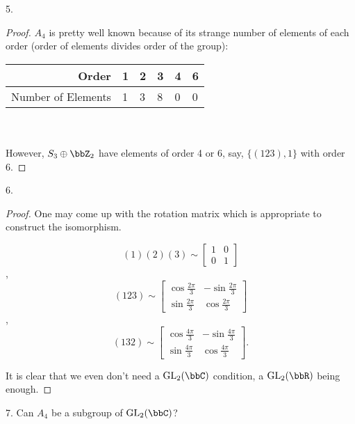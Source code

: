 \begin{exercise}
    5.
\end{exercise}

\begin{proof}
    $A_4$ is pretty well known because of its strange number of elements of each order (order of elements divides order of the group): \\


    \begin{tabular}{rlllll}
    \toprule
    Order              & 1 & 2 & 3 & 4 & 6 \\ \midrule
    Number of Elements & 1 & 3 & 8 & 0 & 0 \\ \bottomrule
    \end{tabular}\\\\
    
    However, $S_3 \oplus \bbZ_2$ have elements of order 4 or 6, say, $\{(123), 1\}$ with order 6. 
\end{proof}

\begin{exercise}
    6.
\end{exercise}

\begin{proof}
    One may come up with the rotation matrix which is appropriate to construct the isomorphism.
    
    $$(1)(2)(3)\sim \begin{bmatrix}
        1 & 0\\
        0 & 1
    \end{bmatrix}$$,
    $$(123)\sim \begin{bmatrix}
        \cos \frac{2\pi}{3} & -\sin \frac{2\pi}{3}\\
        \sin \frac{2\pi}{3} & \cos \frac{2\pi}{3}
    \end{bmatrix}$$,
    $$(132)\sim \begin{bmatrix}
        \cos \frac{4\pi}{3} & -\sin \frac{4\pi}{3}\\
        \sin \frac{4\pi}{3} & \cos \frac{4\pi}{3}
    \end{bmatrix}.$$

    It is clear that we even don't need a $\mathrm{GL}_2(\bbC)$ condition, a $\mathrm{GL}_2(\bbR)$ being enough.
\end{proof}

\begin{exercise}
    7. Can $A_4$ be a subgroup of $\mathrm{GL}_2(\bbC)$?
\end{exercise}

